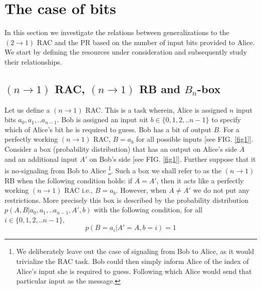 \documentclass[%
 reprint,
 amsmath,amssymb,
 aps,
]{revtex4-1}
\begin{document}
\section{\label{sec:level1}The case of bits}
In this section we investigate the relations between generalizations to the $(2\rightarrow 1)$ RAC and the PR based on the number of input bits provided to Alice. We start by defining the resources under consideration and subsequently study their relationships.
\subsection*{$(n\rightarrow1)$ RAC, $(n\rightarrow1)$ RB and $B_n$-box}
\noindent Let us define a {$(n\rightarrow1)$ RAC}. This is a {task} wherein, Alice is assigned $n$ input bits $a_0,a_1,..a_{n-1}$. Bob is assigned an input $n$it $b\in\{0,1,2,..n-1\}$ to specify which of Alice's bit he is required to guess. Bob has a bit of output $B$. For a perfectly working $(n\rightarrow1)$ RAC, $B=a_b$ for all possible inputs [see FIG. \ref{fig1}]. \\
Consider a box (probability distribution) that has an output on Alice's side $A$ and an additional input $A'$ on Bob's side [see FIG. \ref{fig1}]. Further suppose that it is no-signaling from Bob to Alice \footnote{We deliberately leave out the case of signaling from Bob to Alice, as it would trivialize the RAC task. Bob could then simply inform Alice of the index of Alice's input she is required to guess. Following which Alice would send that particular input as the message.}. Such a box we shall refer to as the $(n\rightarrow1)$ RB when the following condition holds: if $A=A'$, then it acts like a perfectly working $(n\rightarrow1)$ RAC i.e., $B=a_b$. However, when $A\neq A'$ we do not put any restrictions. More precisely this box is described by the probability distribution $p(A,B|a_0,a_1,..a_{n-1},A',b)$ with the following condition, for all $i\in\{0,1,2,..n-1\}$,
\begin{equation}\label{e1}
p(B=a_i|A'=A,b=i)=1
\end{equation}
\end{document}

